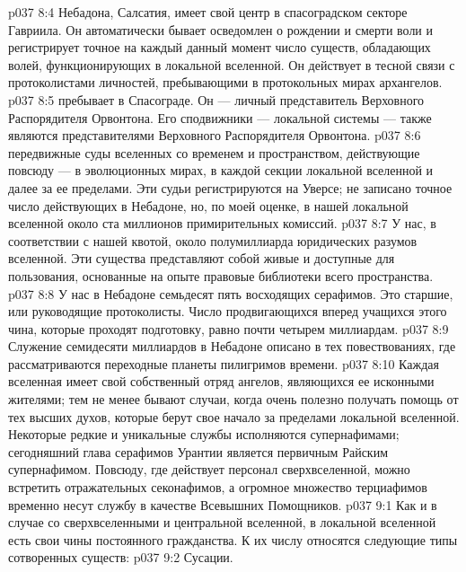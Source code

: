 \vs p037 8:4  Небадона, Салсатия, имеет свой центр в спасоградском секторе Гавриила. Он автоматически бывает осведомлен о рождении и смерти воли и регистрирует точное на каждый данный момент число существ, обладающих волей, функционирующих в локальной вселенной. Он действует в тесной связи с протоколистами личностей, пребывающими в протокольных мирах архангелов.
\vs p037 8:5  пребывает в Спасограде. Он --- личный представитель Верховного Распорядителя Орвонтона. Его сподвижники ---  локальной системы --- также являются представителями Верховного Распорядителя Орвонтона.
\vs p037 8:6  передвижные суды вселенных со временем и пространством, действующие повсюду --- в эволюционных мирах, в каждой секции локальной вселенной и далее за ее пределами. Эти судьи регистрируются на Уверсе; не записано точное число действующих в Небадоне, но, по моей оценке, в нашей локальной вселенной около ста миллионов примирительных комиссий.
\vs p037 8:7 У нас, в соответствии с нашей квотой, около полумиллиарда  юридических разумов вселенной. Эти существа представляют собой живые и доступные для пользования, основанные на опыте правовые библиотеки всего пространства.
\vs p037 8:8 У нас в Небадоне семьдесят пять  восходящих серафимов. Это старшие, или руководящие протоколисты. Число продвигающихся вперед учащихся этого чина, которые проходят подготовку, равно почти четырем миллиардам.
\vs p037 8:9 Служение семидесяти миллиардов  в Небадоне описано в тех повествованиях, где рассматриваются переходные планеты пилигримов времени.
\vs p037 8:10 \pc Каждая вселенная имеет свой собственный отряд ангелов, являющихся ее исконными жителями; тем не менее бывают случаи, когда очень полезно получать помощь от тех высших духов, которые берут свое начало за пределами локальной вселенной. Некоторые редкие и уникальные службы исполняются супернафимами; сегодняшний глава серафимов Урантии является первичным Райским супернафимом. Повсюду, где действует персонал сверхвселенной, можно встретить отражательных секонафимов, а огромное множество терциафимов временно несут службу в качестве Всевышних Помощников.
\vs p037 9:1 Как и в случае со сверхвселенными и центральной вселенной, в локальной вселенной есть свои чины постоянного гражданства. К их числу относятся следующие типы сотворенных существ:
\vs p037 9:2 \bibnobreakspace Сусации.
